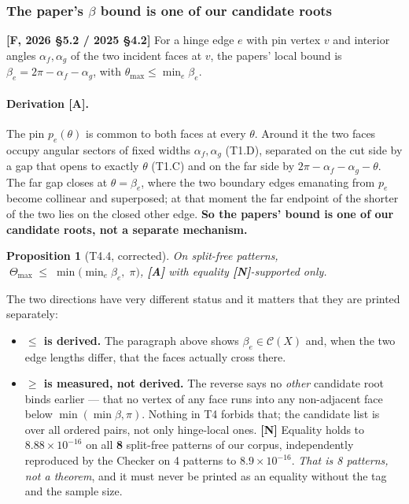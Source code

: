 \documentclass[11pt,a4paper]{article}
\newtheorem{proposition}[theorem]{Proposition}
\theoremstyle{definition}
\newcommand{\Tmax}{\Theta_{\max}}
\begin{document}
\subsubsection{The paper's \texorpdfstring{$\beta$}{beta} bound is one of our candidate roots}

\textbf{[F, 2026 §5.2 / 2025 §4.2]} For a hinge edge $e$ with pin vertex $v$ and interior
angles $\alpha_f,\alpha_g$ of the two incident faces at $v$, the papers' local bound is
$\beta_e=2\pi-\alpha_f-\alpha_g$, with $\theta_{\max}\le\min_e\beta_e$.

\paragraph{Derivation [A].} The pin $p_e(\theta)$ is common to both faces at every $\theta$.
Around it the two faces occupy angular sectors of fixed widths $\alpha_f,\alpha_g$ (T1.D),
separated on the cut side by a gap that opens to exactly $\theta$ (T1.C) and on the far side
by $2\pi-\alpha_f-\alpha_g-\theta$. The far gap closes at $\theta=\beta_e$, where the two
boundary edges emanating from $p_e$ become collinear and superposed; at that moment the far
endpoint of the shorter of the two lies on the closed other edge. \textbf{So the papers'
bound is one of our candidate roots, not a separate mechanism.}

\begin{proposition}[T4.4, corrected]
On split-free patterns,
$\;\Tmax \;\le\; \min\bigl(\min_e\beta_e,\;\pi\bigr)$, \textbf{[A]} with equality
\textbf{[N]}-supported only.
\end{proposition}

\noindent The two directions have very different status and it matters that they are printed
separately:
\begin{itemize}\itemsep2pt
\item \textbf{$\le$ is derived.} The paragraph above shows $\beta_e\in\mathcal{C}(X)$ and,
when the two edge lengths differ, that the faces actually cross there.
\item \textbf{$\ge$ is measured, not derived.} The reverse says no \emph{other} candidate
root binds earlier --- that no vertex of any face runs into any non-adjacent face below
$\min(\min\beta,\pi)$. Nothing in T4 forbids that; the candidate list is over all ordered
pairs, not only hinge-local ones. \textbf{[N]} Equality holds to $8.88\times10^{-16}$ on all
\textbf{8} split-free patterns of our corpus, independently reproduced by the Checker on 4
patterns to $8.9\times10^{-16}$. \emph{That is 8 patterns, not a theorem}, and it must never
be printed as an equality without the tag and the sample size.
\end{itemize}
\end{document}
